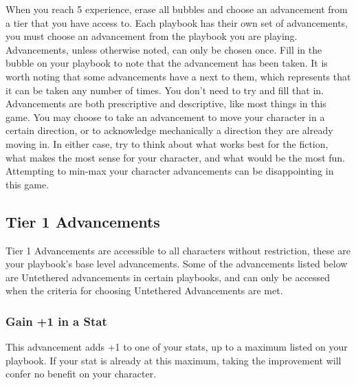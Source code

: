 \documentclass[
  oneside,
  statementpaper,
  9pt]{memoir}
\begin{document}
\begin{Player}

When you reach 5 experience, erase all bubbles and choose an advancement from a tier that you have access to. Each playbook has their own set of advancements, you must choose an advancement from the playbook you are playing. Advancements, unless otherwise noted, can only be chosen once. Fill in the bubble on your playbook to note that the advancement has been taken. It is worth noting that some advancements have a \* next to them, which represents that it can be taken any number of times. You don't need to try and fill that in. Advancements are both prescriptive and descriptive, like most things in this game. You may choose to take an advancement to move your character in a certain direction, or to acknowledge mechanically a direction they are already moving in. In either case, try to think about what works best for the fiction, what makes the most sense for your character, and what would be the most fun. Attempting to min-max your character advancements can be disappointing in this game.

\end{Player}

\hypertarget{tier-1-advancements}{%
\subsection{Tier 1 Advancements}\label{tier-1-advancements}}

\begin{Player}

Tier 1 Advancements are accessible to all characters without restriction, these are your playbook’s base level advancements. Some of the advancements listed below are Untethered advancements in certain playbooks, and can only be accessed when the criteria for choosing Untethered Advancements are met.

\end{Player}

\hypertarget{gain-1-in-a-stat}{%
\subsubsection{Gain +1 in a Stat}\label{gain-1-in-a-stat}}

\begin{Player}

This advancement adds +1 to one of your stats, up to a maximum listed on your playbook. If your stat is already at this maximum, taking the improvement will confer no benefit on your character.

\end{Player}
\end{document}
